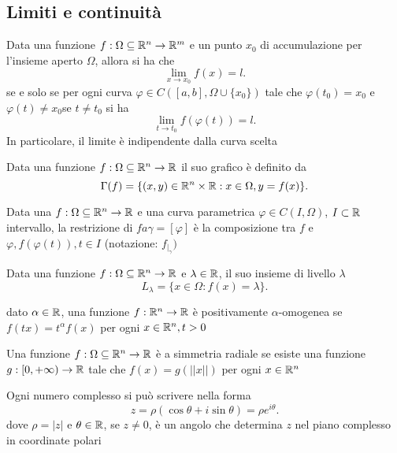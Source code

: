 \documentclass[12px]{article}
\begin{document}
	\subsection{Limiti e continuità}
	\begin{teo}
		Data una funzione $f:\Omega\subseteq\mathbb{R}^n \rightarrow\mathbb{R}^m$ e un punto $x_0$ di accumulazione per l'insieme aperto $\Omega$, allora si ha che
		\[
			\lim_{x \rightarrow x_0}f(x) = l
		.\] 
		se e solo se per ogni curva $ \varphi\in C([a,b],\Omega\cup \{x_0\})$ tale che $ \varphi(t_0)=x_0$ e $ \varphi(t)\neq x_0$se $t\neq t_0$ si ha
		\[
			\lim_{t \rightarrow t_0} f( \varphi(t)) = l
		.\] 
		In particolare, il limite è indipendente dalla curva scelta
	\end{teo}
	\begin{defi}[grafico]
		Data una funzione $f:\Omega\subseteq \mathbb{R}^n \rightarrow \mathbb{R}$ il suo grafico è definito da 
		\[
			\Gamma (f) = \{(x,y)\in \mathbb{R}^n\times \mathbb{R} : x\in \Omega, y = f(x)\}
		.\] 
	\end{defi}
	\begin{defi}
		Data una $f:\Omega\subseteq\mathbb{R}^n \rightarrow \mathbb{R}$ e una curva parametrica $ \varphi\in C(I,\Omega)$, $I\subset \mathbb{R}$ intervallo, la restrizione di  $f a \gamma = [ \varphi]$ è la composizione tra $f$ e $ \varphi, f( \varphi(t)), t\in I$ (notazione: $f_{|_\gamma})$
	\end{defi}
	\begin{defi}
		Data una funzione $f:\Omega \subseteq \mathbb{R}^n \rightarrow\mathbb{R}$ e $\lambda\in \mathbb{R}$, il suo insieme di livello  $\lambda$
		 \[
			 L_\lambda = \{x\in \Omega: f(x) = \lambda\}
		.\] 
	\end{defi}
	\begin{defi}
		dato $\alpha\in \mathbb{R}$, una funzione $f:\mathbb{R}^n \rightarrow\mathbb{R}$ è positivamente $\alpha$-omogenea se $f(tx) = t^\alpha f(x)$ per ogni  $x\in \mathbb{R}^n, t > 0$
	\end{defi}
	\begin{defi}
		Una funzione $f:\Omega\subseteq\mathbb{R}^n \rightarrow \mathbb{R}$ è a simmetria radiale se esiste una funzione $g:[0,+\infty) \rightarrow \mathbb{R}$ tale che $f(x) = g(||x||)$ per ogni $x\in \mathbb{R}^n$
	\end{defi}
	\newpage
	\begin{defi}
		Ogni numero complesso si può scrivere nella forma
		\[
			z = \rho(\cos\theta + i\sin\theta) = \rho e^{i\theta}
		.\] 
		dove $\rho = |z|$ e $\theta\in \mathbb{R}$, se  $z\neq 0$, è un angolo che determina  $z$ nel piano complesso in coordinate polari
	\end{defi}
\end{document}
